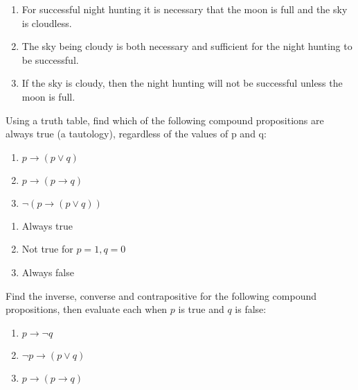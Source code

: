\documentclass[]{exam}
\begin{document}
\begin{questions}
\begin{parts}
          \begin{solution}
            \begin{enumerate}
              \item For successful night hunting it is necessary that the moon
                is full and the sky is cloudless.
              \item The sky being cloudy is both necessary and sufficient for
                the night hunting to be successful.
              \item  If the sky is cloudy, then the night hunting will not be
                successful unless the moon is full.
            \end{enumerate}
          \end{solution}
      \end{parts}

    \newpage

    \question Using a truth table, find which of the following compound
      propositions are always true (a tautology), regardless of the values of p
      and q: 
      \begin{enumerate} 
        \item $p \rightarrow (p \lor q)$
        \item $p \rightarrow (p \rightarrow q)$
        \item $\lnot (p \rightarrow (p \lor q))$
      \end{enumerate}

      \begin{solution}
        \begin{enumerate} 
          \item Always true
          \item Not true for $p = 1, q = 0$
          \item Always false
        \end{enumerate}
      \end{solution}

    \question Find the inverse, converse and contrapositive for the following
      compound propositions, then evaluate each when $p$ is true and $q$ is
      false:
      \begin{enumerate} 
        \item $p \rightarrow \lnot q$
        \item $\lnot p \rightarrow (p \lor q)$
        \item $p \rightarrow (p \rightarrow q)$
      \end{enumerate}
  \end{questions}
\end{document}

